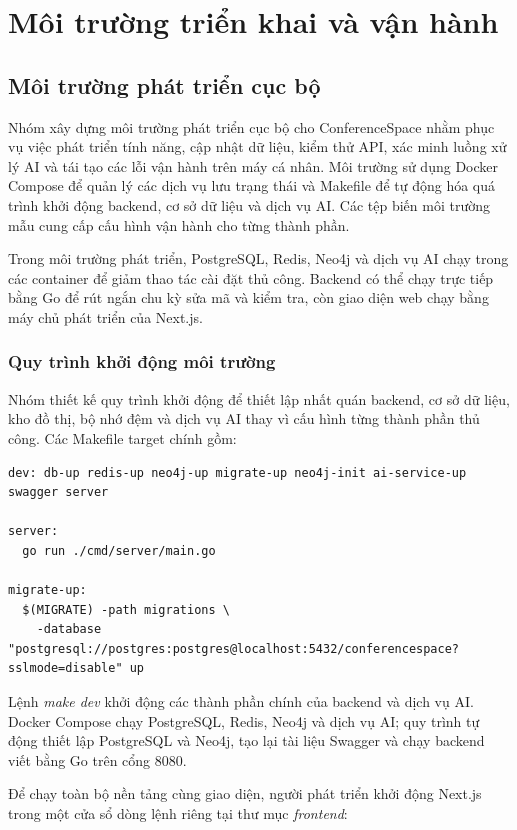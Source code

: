 \section{Môi trường triển khai và vận hành}

\subsection{Môi trường phát triển cục bộ}

Nhóm xây dựng môi trường phát triển cục bộ cho ConferenceSpace nhằm phục vụ việc phát triển tính năng, cập nhật dữ liệu, kiểm thử API, xác minh luồng xử lý AI và tái tạo các lỗi vận hành trên máy cá nhân. Môi trường sử dụng Docker Compose để quản lý các dịch vụ lưu trạng thái và Makefile để tự động hóa quá trình khởi động backend, cơ sở dữ liệu và dịch vụ AI. Các tệp biến môi trường mẫu cung cấp cấu hình vận hành cho từng thành phần.

Trong môi trường phát triển, PostgreSQL, Redis, Neo4j và dịch vụ AI chạy trong các container để giảm thao tác cài đặt thủ công. Backend có thể chạy trực tiếp bằng Go để rút ngắn chu kỳ sửa mã và kiểm tra, còn giao diện web chạy bằng máy chủ phát triển của Next.js.

\subsubsection{Quy trình khởi động môi trường}

Nhóm thiết kế quy trình khởi động để thiết lập nhất quán backend, cơ sở dữ liệu, kho đồ thị, bộ nhớ đệm và dịch vụ AI thay vì cấu hình từng thành phần thủ công. Các Makefile target chính gồm:

\begin{lstlisting}
dev: db-up redis-up neo4j-up migrate-up neo4j-init ai-service-up swagger server

server:
  go run ./cmd/server/main.go

migrate-up:
  $(MIGRATE) -path migrations \
    -database "postgresql://postgres:postgres@localhost:5432/conferencespace?sslmode=disable" up
\end{lstlisting}

Lệnh \textit{make dev} khởi động các thành phần chính của backend và dịch vụ AI. Docker Compose chạy PostgreSQL, Redis, Neo4j và dịch vụ AI; quy trình tự động thiết lập PostgreSQL và Neo4j, tạo lại tài liệu Swagger và chạy backend viết bằng Go trên cổng 8080.

Để chạy toàn bộ nền tảng cùng giao diện, người phát triển khởi động Next.js trong một cửa sổ dòng lệnh riêng tại thư mục \textit{frontend}:

